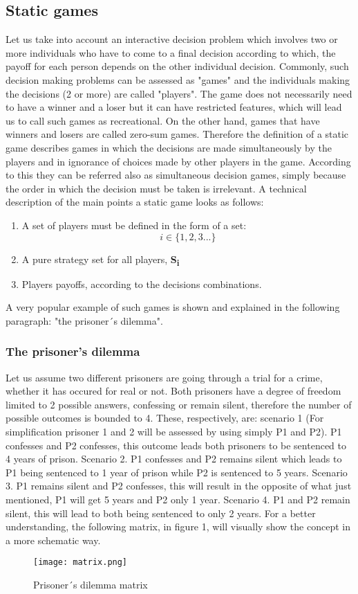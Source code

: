 \documentclass[conference]{IEEEtran}
\begin{document}
\subsection{Static games}
Let us take into account an interactive decision problem which involves two or more individuals who have to come to a final decision according to which, the payoff for each person depends on the other individual decision. Commonly, such decision making problems can be assessed as "games" and the individuals making the decisions (2 or more) are called "players". The game does not necessarily need to have a winner and a loser but it can have restricted features, which will lead us to call such games as recreational. On the other hand, games
that have winners and losers are called zero-sum games. 
Therefore the definition of a static game describes games in which the decisions are made simultaneously by the players and in ignorance of choices made by other players in the game. According to this they can be referred also as simultaneous decision games, simply because the order in which the decision must be taken is irrelevant\cite{b3}. A technical description of the main points a static game looks as follows:
\begin{enumerate}
  \item A set of players must be defined in the form of a set: \[i\in       \{1,2,3...\}\]
  \item A pure strategy set for all players, \textbf{S{\textsubscript{i}}}
  \item Players payoffs, according to the decisions combinations.
\end{enumerate} 
A very popular example of such games is shown and explained in the following paragraph: "the prisoner´s dilemma"\cite{b4}.
\subsubsection{The prisoner's dilemma}
Let us assume two different prisoners are going through a trial for a crime, whether it has occured for real or not. Both prisoners have a degree of freedom limited to 2 possible answers, confessing or remain silent, therefore the number of possible outcomes is bounded to 4. These, respectively, are: scenario 1 (For simplification prisoner 1 and 2 will be assessed by using simply P1 and P2). P1 confesses and P2 confesses, this outcome leads both prisoners to be sentenced to 4 years of prison. Scenario 2. P1 confesses and P2 remains silent which leads to P1 being sentenced to 1 year of prison while P2 is sentenced to 5 years. Scenario 3. P1 remains silent and P2 confesses, this will result in the opposite of what just mentioned, P1 will get 5 years and P2 only 1 year. Scenario 4. P1 and P2 remain silent, this will lead to both being sentenced to only 2 years. For a better understanding, the following matrix, in figure 1, will visually show the concept in a more schematic way.
\begin{figure}[h]
    \centerline{\texttt{[image: matrix.png]}}
    \caption{Prisoner´s dilemma matrix}
    \label{pdmatrix}
\end{figure}
\end{document}
